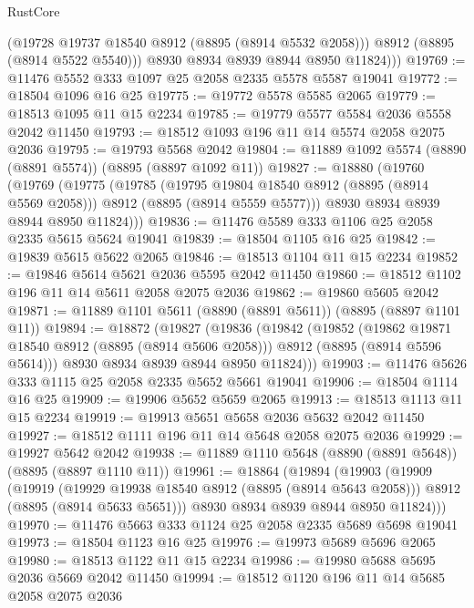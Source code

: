 \begin{lexlean}{RustCore}
\begin{coremodule}
            (@19728 @19737 @18540 @8912 (@8895 (@8914 @5532 @2058)))
            @8912
            (@8895 (@8914 @5522 @5540)))
          @8930
          @8934
          @8939
          @8944
          @8950
          @11824)))
@19769 := @11476 @5552 @333 @1097 @25 @2058 @2335 @5578 @5587 @19041
@19772 := @18504 @1096 @16 @25
@19775 := @19772 @5578 @5585 @2065
@19779 := @18513 @1095 @11 @15 @2234
@19785 := @19779 @5577 @5584 @2036 @5558 @2042 @11450
@19793 := @18512 @1093 @196 @11 @14 @5574 @2058 @2075 @2036
@19795 := @19793 @5568 @2042
@19804 := @11889 @1092 @5574 (@8890 (@8891 @5574)) (@8895 (@8897 @1092 @11))
@19827 := @18880
    (@19760
      (@19769
        (@19775
          (@19785
            (@19795 @19804 @18540 @8912 (@8895 (@8914 @5569 @2058)))
            @8912
            (@8895 (@8914 @5559 @5577)))
          @8930
          @8934
          @8939
          @8944
          @8950
          @11824)))
@19836 := @11476 @5589 @333 @1106 @25 @2058 @2335 @5615 @5624 @19041
@19839 := @18504 @1105 @16 @25
@19842 := @19839 @5615 @5622 @2065
@19846 := @18513 @1104 @11 @15 @2234
@19852 := @19846 @5614 @5621 @2036 @5595 @2042 @11450
@19860 := @18512 @1102 @196 @11 @14 @5611 @2058 @2075 @2036
@19862 := @19860 @5605 @2042
@19871 := @11889 @1101 @5611 (@8890 (@8891 @5611)) (@8895 (@8897 @1101 @11))
@19894 := @18872
    (@19827
      (@19836
        (@19842
          (@19852
            (@19862 @19871 @18540 @8912 (@8895 (@8914 @5606 @2058)))
            @8912
            (@8895 (@8914 @5596 @5614)))
          @8930
          @8934
          @8939
          @8944
          @8950
          @11824)))
@19903 := @11476 @5626 @333 @1115 @25 @2058 @2335 @5652 @5661 @19041
@19906 := @18504 @1114 @16 @25
@19909 := @19906 @5652 @5659 @2065
@19913 := @18513 @1113 @11 @15 @2234
@19919 := @19913 @5651 @5658 @2036 @5632 @2042 @11450
@19927 := @18512 @1111 @196 @11 @14 @5648 @2058 @2075 @2036
@19929 := @19927 @5642 @2042
@19938 := @11889 @1110 @5648 (@8890 (@8891 @5648)) (@8895 (@8897 @1110 @11))
@19961 := @18864
    (@19894
      (@19903
        (@19909
          (@19919
            (@19929 @19938 @18540 @8912 (@8895 (@8914 @5643 @2058)))
            @8912
            (@8895 (@8914 @5633 @5651)))
          @8930
          @8934
          @8939
          @8944
          @8950
          @11824)))
@19970 := @11476 @5663 @333 @1124 @25 @2058 @2335 @5689 @5698 @19041
@19973 := @18504 @1123 @16 @25
@19976 := @19973 @5689 @5696 @2065
@19980 := @18513 @1122 @11 @15 @2234
@19986 := @19980 @5688 @5695 @2036 @5669 @2042 @11450
@19994 := @18512 @1120 @196 @11 @14 @5685 @2058 @2075 @2036

\end{coremodule}
\end{lexlean}
